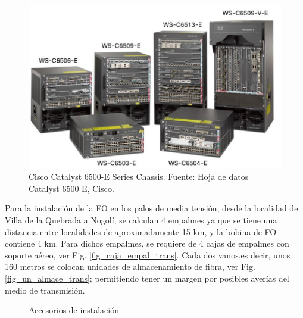 \documentclass[12pt,a4paper]{book}
\begin{document}
\begin{figure}
\centering
\includegraphics[width= 8 cm]{../figuras/Catalyst_6500.jpg}
\caption{Cisco Catalyst 6500-E Series Chassis. Fuente: Hoja de datos Catalyst 6500 E, Cisco.}
\label{fig_Catalyst_6500}
\end{figure}

Para la instalación de la FO en los palos de media tensión, desde la localidad de Villa de la Quebrada a Nogolí, se calculan 4 empalmes ya que se tiene una distancia entre localidades de aproximadamente 15 km, y la bobina de FO contiene 4 km. Para dichos empalmes, se requiere de 4 cajas de empalmes con soporte aéreo, ver Fig. \ref{fig_caja_empal_trans}. Cada dos vanos,es decir, unos 160 metros se colocan unidades de almacenamiento de fibra, ver Fig. \ref{fig_un_almace_trans}; permitiendo tener un margen por posibles averías del medio de transmisión.

\begin{figure}[H]
\centering
{} \thinspace
{}
\caption{Accesorios de instalación}
\end{figure}
\end{document}
